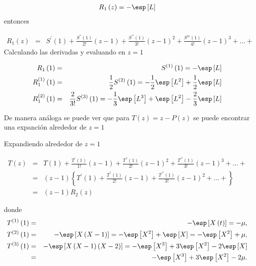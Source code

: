\begin{eqnarray}\label{Eq.R1}
R_{1}\left(z\right)=-\esp\left[L\right]
\end{eqnarray}
entonces

\begin{eqnarray}
R_{1}\left(z\right)&=&S^{'}\left(1\right)+\frac{S^{''}\left(1\right)}{2!}\left(z-1\right)+\frac{S^{'''}\left(1\right)}{3!}\left(z-1\right)^{2}+\frac{S^{iv}\left(1\right)}{4!}\left(z-1\right)^{3}+\ldots+
\end{eqnarray}
Calculando las derivadas y evaluando en $z=1$

\begin{eqnarray}
R_{1}\left(1\right)&=&S^{(1)}\left(1\right)=-\esp\left[L\right]\\
R_{1}^{(1)}\left(1\right)&=&\frac{1}{2}S^{(2)}\left(1\right)=-\frac{1}{2}\esp\left[L^{2}\right]+\frac{1}{2}\esp\left[L\right]\\
R_{1}^{(2)}\left(1\right)&=&\frac{2}{3!}S^{(3)}\left(1\right)
=-\frac{1}{3}\esp\left[L^{3}\right]+\esp\left[L^{2}\right]-\frac{2}{3}\esp\left[L\right]
\end{eqnarray}

De manera an\'aloga se puede ver que para $T\left(z\right)=z-P\left(z\right)$ se puede encontrar una expanci\'on alrededor de $z=1$

Expandiendo alrededor de $z=1$

\begin{eqnarray*}
T\left(z\right)&=&T\left(1\right)+\frac{T^{'}\left(1\right)}{1!}\left(z-1\right)+\frac{T^{''}\left(1\right)}{2!}\left(z-1\right)^{2}+\frac{T^{'''}\left(1\right)}{3!}\left(z-1\right)^{3}+\ldots+\\
&=&\left(z-1\right)\left\{T^{'}\left(1\right)+\frac{T^{''}\left(1\right)}{2!}\left(z-1\right)+\frac{T^{'''}\left(1\right)}{3!}\left(z-1\right)^{2}+\ldots+\right\}\\
&=&\left(z-1\right)R_{2}\left(z\right)
\end{eqnarray*}

donde 
\begin{eqnarray*}
T^{(1)}\left(1\right)&=&-\esp\left[X\left(t\right)\right]=-\mu,\\ T^{(2)}\left(1\right)&=&-\esp\left[X\left(X-1\right)\right]
=-\esp\left[X^{2}\right]+\esp\left[X\right]=-\esp\left[X^{2}\right]+\mu,\\
T^{(3)}\left(1\right)&=&-\esp\left[X\left(X-1\right)\left(X-2\right)\right]
=-\esp\left[X^{3}\right]+3\esp\left[X^{2}\right]-2\esp\left[X\right]\\
&=&-\esp\left[X^{3}\right]+3\esp\left[X^{2}\right]-2\mu.
\end{eqnarray*}

